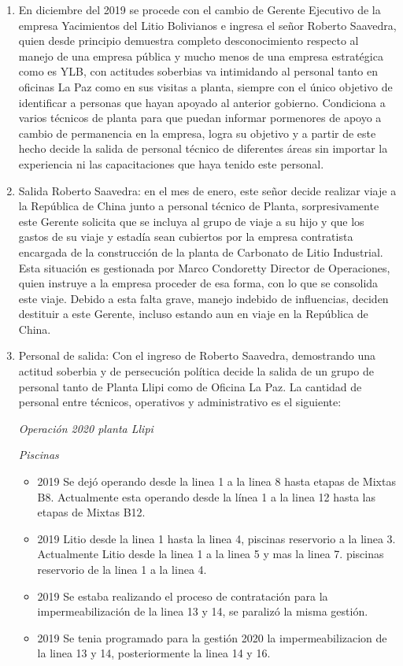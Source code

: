 \documentclass[a4paper, nobind]{templates/ociamthesis}
\begin{document}
\begin{enumerate}
\def\labelenumi{\arabic{enumi}.}
\item
  En diciembre del 2019 se procede con el cambio de Gerente Ejecutivo de la empresa Yacimientos del Litio Bolivianos e ingresa el señor Roberto Saavedra, quien desde principio demuestra completo desconocimiento respecto al manejo de una empresa pública y mucho menos de una empresa estratégica como es YLB, con actitudes soberbias va intimidando al personal tanto en oficinas La Paz como en sus visitas a planta, siempre con el único objetivo de identificar a personas que hayan apoyado al anterior gobierno. Condiciona a varios técnicos de planta para que puedan informar pormenores de apoyo a cambio de permanencia en la empresa, logra su objetivo y a partir de este hecho decide la salida de personal técnico de diferentes áreas sin importar la experiencia ni las capacitaciones que haya tenido este personal.
\item
  Salida Roberto Saavedra: en el mes de enero, este señor decide realizar viaje a la República de China junto a personal técnico de Planta, sorpresivamente este Gerente solicita que se incluya al grupo de viaje a su hijo y que los gastos de su viaje y estadía sean cubiertos por la empresa contratista encargada de la construcción de la planta de Carbonato de Litio Industrial. Esta situación es gestionada por Marco Condoretty Director de Operaciones, quien instruye a la empresa proceder de esa forma, con lo que se consolida este viaje. Debido a esta falta grave, manejo indebido de influencias, deciden destituir a este Gerente, incluso estando aun en viaje en la República de China.
\item
  Personal de salida: Con el ingreso de Roberto Saavedra, demostrando una actitud soberbia y de persecución política decide la salida de un grupo de personal tanto de Planta Llipi como de Oficina La Paz. La cantidad de personal entre técnicos, operativos y administrativo es el siguiente:

  \emph{Operación 2020 planta Llipi}

  \emph{Piscinas}

  \begin{itemize}
  \item
    2019 Se dejó operando desde la linea 1 a la linea 8 hasta etapas de Mixtas B8. Actualmente esta operando desde la línea 1 a la linea 12 hasta las etapas de Mixtas B12.
  \item
    2019 Litio desde la linea 1 hasta la linea 4, piscinas reservorio a la linea 3. Actualmente Litio desde la linea 1 a la linea 5 y mas la linea 7. piscinas reservorio de la linea 1 a la linea 4.
  \item
    2019 Se estaba realizando el proceso de contratación para la impermeabilización de la linea 13 y 14, se paralizó la misma gestión.
  \item
    2019 Se tenia programado para la gestión 2020 la impermeabilizacion de la linea 13 y 14, posteriormente la linea 14 y 16.
  \end{itemize}


\end{enumerate}
\end{document}
